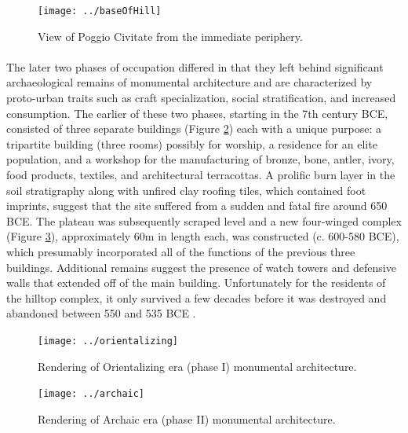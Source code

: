\documentclass[12pt,a4paper]{thesis}
\begin{document}
\begin{figure}
\centering
\texttt{[image: ../baseOfHill]}
\caption[View of Poggio Civitate from the immediate periphery]{View of Poggio Civitate from the immediate periphery\footnotemark.}
\label{fig:baseOfHill}
\end{figure}


\paragraph{}
The later two phases of occupation differed in that they left behind significant archaeological remains of monumental architecture and are characterized by proto-urban traits such as craft specialization, social stratification, and increased consumption. The earlier of these two phases, starting in the 7th century BCE, consisted of three separate buildings (Figure \ref{fig:orientalizing}) each with a unique purpose: a tripartite building (three rooms) possibly for worship, a residence for an elite population, and a workshop for the manufacturing of bronze, bone, antler, ivory, food products, textiles, and architectural terracottas. A prolific burn layer in the soil stratigraphy along with unfired clay roofing tiles, which contained foot imprints, suggest that the site suffered from a sudden and fatal fire around 650 BCE. The plateau was subsequently scraped level and a new four-winged  complex (Figure \ref{fig:archaic}), approximately 60m in length each, was constructed (c. 600-580 BCE), which presumably incorporated all of the functions of the previous three buildings. Additional remains suggest the presence of watch towers and defensive walls that extended off of the main building. Unfortunately for the residents of the hilltop complex, it only survived a few decades before it was destroyed and abandoned between 550 and 535 BCE \cite[p. 35-45]{NieTuc01}.

\begin{figure}
\centering
\texttt{[image: ../orientalizing]}
\caption[Rendering of Orientalizing era (phase I) monumental architecture]{Rendering of Orientalizing era (phase I) monumental architecture\footnotemark.}
\label{fig:orientalizing}
\end{figure}


\begin{figure}
\centering
\texttt{[image: ../archaic]}
\caption[Rendering of Archaic era (phase II) monumental architecture]{Rendering of Archaic era (phase II) monumental architecture\footnotemark.}
\label{fig:archaic}
\end{figure}
\end{document}
